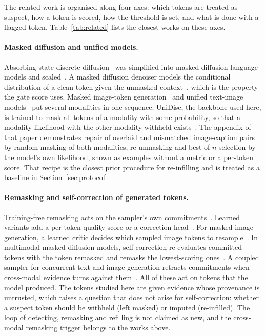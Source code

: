 
The related work is organised along four axes: which tokens are treated as suspect, how a token is scored, how the
threshold is set, and what is done with a flagged token.
Table~\ref{tab:related} lists the closest works on these axes.

\paragraph{Masked diffusion and unified models.}
Absorbing-state discrete diffusion~\citep{austin2021d3pm,lou2024sedd} was simplified into masked diffusion language models
\citep{sahoo2024mdlm} and scaled~\citep{nie2025llada}.
A masked diffusion denoiser models the conditional distribution of a clean token given the unmasked context~\citep{ou2025radd},
which is the property the gate score uses.
Masked image-token generation~\citep{chang2022maskgit} and unified text-image models~\citep{swerdlow2025unidisc,yang2025mmada,li2025lavida,shi2025muddit}
put several modalities in one sequence.
UniDisc, the backbone used here, is trained to mask all tokens of a modality with some probability, so that a modality
likelihood with the other modality withheld exists~\citep{swerdlow2025unidisc}.
The appendix of that paper demonstrates repair of overlaid and mismatched image-caption pairs by random masking of both
modalities, re-unmasking and best-of-$n$ selection by the model's own likelihood, shown as examples without a metric or a
per-token score.
That recipe is the closest prior procedure for re-infilling and is treated as a baseline in Section~\ref{sec:protocol}.

\paragraph{Remasking and self-correction of generated tokens.}
Training-free remasking acts on the sampler's own commitments~\citep{wang2025remdm,zhai2026core,yao2026remask}.
Learned variants add a per-token quality score or a correction head~\citep{kim2025prism,schiff2026proseco,huang2025remedi}.
For masked image generation, a learned critic decides which sampled image tokens to resample~\citep{lezama2022tokencritic}.
In multimodal masked diffusion models, self-correction re-evaluates committed tokens with the token remasked and remasks the
lowest-scoring ones~\citep{ouyang2026freecorrection}.
A coupled sampler for concurrent text and image generation retracts commitments when cross-modal evidence turns against
them~\citep{le2026co2jump}.
All of these act on tokens that the model produced.
The tokens studied here are given evidence whose provenance is untrusted, which raises a question that does not arise for
self-correction: whether a suspect token should be withheld (left masked) or imputed (re-infilled).
The loop of detecting, remasking and refilling is not claimed as new, and the cross-modal remasking trigger belongs to the
works above.

